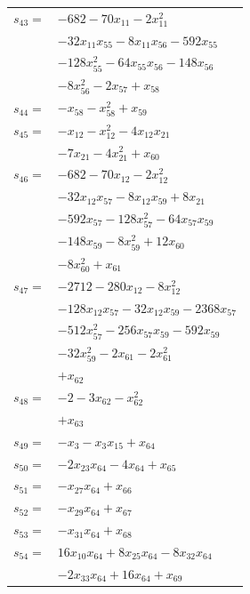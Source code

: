 \begin{longtable}{@{}r@{\;}l@{}}
\(s_{43}=\) & \(\displaystyle -682 -70x_{11} -2x_{11}^{2}\) \\
 & \(\displaystyle -32x_{11}x_{55} -8x_{11}x_{56} -592x_{55}\) \\
 & \(\displaystyle -128x_{55}^{2} -64x_{55}x_{56} -148x_{56}\) \\
 & \(\displaystyle -8x_{56}^{2} -2x_{57} +x_{58}\) \\[3pt]
\(s_{44}=\) & \(\displaystyle -x_{58} -x_{58}^{2} +x_{59}\) \\[3pt]
\(s_{45}=\) & \(\displaystyle -x_{12} -x_{12}^{2} -4x_{12}x_{21}\) \\
 & \(\displaystyle -7x_{21} -4x_{21}^{2} +x_{60}\) \\[3pt]
\(s_{46}=\) & \(\displaystyle -682 -70x_{12} -2x_{12}^{2}\) \\
 & \(\displaystyle -32x_{12}x_{57} -8x_{12}x_{59} +8x_{21}\) \\
 & \(\displaystyle -592x_{57} -128x_{57}^{2} -64x_{57}x_{59}\) \\
 & \(\displaystyle -148x_{59} -8x_{59}^{2} +12x_{60}\) \\
 & \(\displaystyle -8x_{60}^{2} +x_{61}\) \\[3pt]
\(s_{47}=\) & \(\displaystyle -2712 -280x_{12} -8x_{12}^{2}\) \\
 & \(\displaystyle -128x_{12}x_{57} -32x_{12}x_{59} -2368x_{57}\) \\
 & \(\displaystyle -512x_{57}^{2} -256x_{57}x_{59} -592x_{59}\) \\
 & \(\displaystyle -32x_{59}^{2} -2x_{61} -2x_{61}^{2}\) \\
 & \(\displaystyle +x_{62}\) \\[3pt]
\(s_{48}=\) & \(\displaystyle -2 -3x_{62} -x_{62}^{2}\) \\
 & \(\displaystyle +x_{63}\) \\[3pt]
\(s_{49}=\) & \(\displaystyle -x_{3} -x_{3}x_{15} +x_{64}\) \\[3pt]
\(s_{50}=\) & \(\displaystyle -2x_{23}x_{64} -4x_{64} +x_{65}\) \\[3pt]
\(s_{51}=\) & \(\displaystyle -x_{27}x_{64} +x_{66}\) \\[3pt]
\(s_{52}=\) & \(\displaystyle -x_{29}x_{64} +x_{67}\) \\[3pt]
\(s_{53}=\) & \(\displaystyle -x_{31}x_{64} +x_{68}\) \\[3pt]
\(s_{54}=\) & \(\displaystyle 16x_{10}x_{64} +8x_{25}x_{64} -8x_{32}x_{64}\) \\
 & \(\displaystyle -2x_{33}x_{64} +16x_{64} +x_{69}\) \\[3pt]

\end{longtable}
